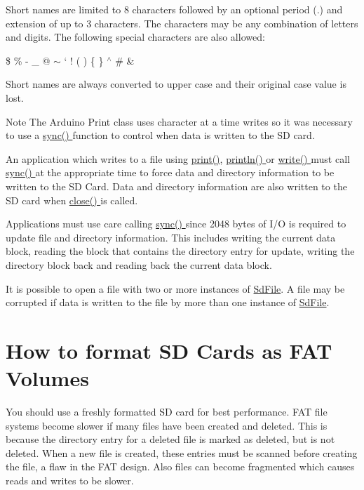 Short names are limited to 8 characters followed by an optional period (.) and extension of up to 3 characters. The characters may be any combination of letters and digits. The following special characters are also allowed\+:

\$ \% \textquotesingle{} -\/ \+\_\+ @ $\sim$ ` ! ( ) \{ \} $^\wedge$ \# \&

Short names are always converted to upper case and their original case value is lost.

\begin{DoxyNote}{Note}
The Arduino Print class uses character at a time writes so it was necessary to use a \hyperlink{class_sd_file_a742d64ca964583ac3a92b31f0eba5e14}{sync() } function to control when data is written to the SD card.
\end{DoxyNote}
\begin{DoxyParagraph}{}
An application which writes to a file using \hyperlink{}{print()}, \hyperlink{}{println() } or \hyperlink{class_sd_file_a67267a4b63d03a16e099195935613006}{write() } must call \hyperlink{class_sd_file_a742d64ca964583ac3a92b31f0eba5e14}{sync() } at the appropriate time to force data and directory information to be written to the SD Card. Data and directory information are also written to the SD card when \hyperlink{class_sd_file_a6b24350c89cc41ff644a343231a3983c}{close() } is called.
\end{DoxyParagraph}
\begin{DoxyParagraph}{}
Applications must use care calling \hyperlink{class_sd_file_a742d64ca964583ac3a92b31f0eba5e14}{sync() } since 2048 bytes of I/O is required to update file and directory information. This includes writing the current data block, reading the block that contains the directory entry for update, writing the directory block back and reading back the current data block.
\end{DoxyParagraph}
It is possible to open a file with two or more instances of \hyperlink{class_sd_file}{Sd\+File}. A file may be corrupted if data is written to the file by more than one instance of \hyperlink{class_sd_file}{Sd\+File}.\hypertarget{index_HowTo}{}\section{How to format S\+D Cards as F\+A\+T Volumes}\label{index_HowTo}
You should use a freshly formatted SD card for best performance. F\+AT file systems become slower if many files have been created and deleted. This is because the directory entry for a deleted file is marked as deleted, but is not deleted. When a new file is created, these entries must be scanned before creating the file, a flaw in the F\+AT design. Also files can become fragmented which causes reads and writes to be slower.

